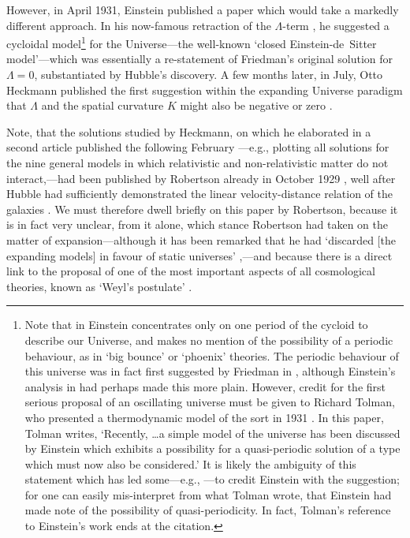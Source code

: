However, in April 1931, Einstein published a paper which would take a markedly different approach. In his now-famous retraction of the $\Lambda$-term \cite{Einstein1931}, he suggested a cycloidal model\footnote{Note that in \cite{Einstein1931} Einstein concentrates only on one period of the cycloid to describe our Universe, and makes no mention of the possibility of a periodic behaviour, as in `big bounce' or `phoenix' theories. The periodic behaviour of this universe was in fact first suggested by Friedman in \cite{Friedmann1922,Friedmann1999a}, although Einstein's analysis in \cite{Einstein1931} had perhaps made this more plain. However, credit for the first serious proposal of an oscillating universe must be given to Richard Tolman, who presented a thermodynamic model of the sort in 1931 \cite{Tolman1931}. In this paper, Tolman writes, `Recently, \ldots a simple model of the universe has been discussed by Einstein \cite{Einstein1931} which exhibits a possibility for a quasi-periodic solution of a type which must now also be considered.' It is likely the ambiguity of this statement which has led some---e.g., \cite{Penrose1979a}---to credit Einstein with the suggestion; for one can easily mis-interpret from what Tolman wrote, that Einstein had made note of the possibility of quasi-periodicity. In fact, Tolman's reference to Einstein's work ends at the citation.} for the Universe---the well-known `closed Einstein-de~Sitter model'---which was essentially a re-statement of Friedman's original solution for $\Lambda=0$, substantiated by Hubble's discovery. A few months later, in July, Otto Heckmann published the first suggestion within the expanding Universe paradigm that $\Lambda$ and the spatial curvature $K$ might also be negative or zero \cite{Heckmann1931}. 

Note, that the solutions studied by Heckmann, on which he elaborated in a second article published the following February \cite{Heckmann1932}---e.g., plotting all solutions for the nine general models in which relativistic and non-relativistic matter do not interact,---had been published by Robertson already in October 1929 \cite{Robertson1929}, well after Hubble had sufficiently demonstrated the linear velocity-distance relation of the galaxies \cite{Hubble1929}. We must therefore dwell briefly on this paper by Robertson, because it is in fact very unclear, from it alone, which stance Robertson had taken on the matter of expansion---although it has been remarked that he had `discarded [the expanding models] in favour of static universes' \cite{Krasinski1999b},---and because there is a direct link to the proposal of one of the most important aspects of all cosmological theories, known as `Weyl's postulate' \cite{Robertson1933,Bondi1961, Rugh2010}.

